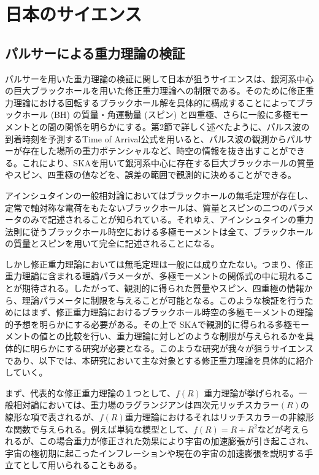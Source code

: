 \section{日本のサイエンス}\label{pulsar.s3}

\subsection{パルサーによる重力理論の検証}

パルサーを用いた重力理論の検証に関して日本が狙うサイエンスは、銀河系中心の巨大ブラックホールを用いた修正重力理論への制限である。そのために修正重力理論における回転するブラックホール解を具体的に構成することによってブラックホール (BH) の質量・角運動量 (スピン) と四重極、さらに一般に多極モーメントとの間の関係を明らかにする。第2節で詳しく述べたように、パルス波の到着時刻を予測するTime of Arrival公式を用いると、パルス波の観測からパルサーが存在した場所の重力ポテンシャルなど、時空の情報を抜き出すことができる。これにより、SKAを用いて銀河系中心に存在する巨大ブラックホールの質量やスピン、四重極の値などを、誤差の範囲で観測的に決めることができる。

アインシュタインの一般相対論においてはブラックホールの無毛定理が存在し、定常で軸対称な電荷をもたないブラックホールは、質量とスピンの二つのパラメータのみで記述されることが知られている。それゆえ、アインシュタインの重力法則に従うブラックホール時空における多極モーメントは全て、ブラックホールの質量とスピンを用いて完全に記述されることになる。

しかし修正重力理論においては無毛定理は一般には成り立たない。つまり、修正重力理論に含まれる理論パラメータが、多極モーメントの関係式の中に現れることが期待される。したがって、観測的に得られた質量やスピン、四重極の情報から、理論パラメータに制限を与えることが可能となる。このような検証を行うためにはまず、修正重力理論におけるブラックホール時空の多極モーメントの理論的予想を明らかにする必要がある。その上で SKAで観測的に得られる多極モーメントの値との比較を行い、重力理論に対しどのような制限が与えられるかを具体的に明らかにする研究が必要となる。このような研究が我々が狙うサイエンスであり、以下では、本研究において主な対象とする修正重力理論を具体的に紹介していく。

まず、代表的な修正重力理論の１つとして、$f(R)$ 重力理論が挙げられる。一般相対論においては、重力場のラグランジアンは四次元リッチスカラー$(R)$の線形な項で表されるが、$f(R)$重力理論におけるそれはリッチスカラーの非線形な関数で与えられる。例えば単純な模型として、$f(R) = R + R^2$などが考えられるが、この場合重力が修正された効果により宇宙の加速膨張が引き起こされ、宇宙の極初期に起こったインフレーションや現在の宇宙の加速膨張を説明する手立てとして用いられることもある。

